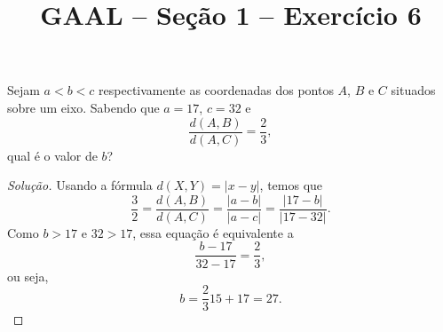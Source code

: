 \documentclass[a4paper,11pt]{article}
\title{GAAL -- Seção 1 -- Exercício 6}
\author{\empty}
\date{\empty}
\newcommand\onlyinsubfileone\maketitle
\begin{document}
\onlyinsubfileone

\begin{exercicio-gaal}[E6.S1]
  Sejam $a < b < c$ respectivamente as coordenadas dos pontos $A$, $B$ e $C$ situados sobre um eixo.
  Sabendo que $a = 17$, $c = 32$ e
  \[
    \frac{d(A,B)}{d(A,C)} = \frac{2}{3},
  \]
  qual é o valor de $b$?
\end{exercicio-gaal}

\begin{proof}[Solução]
  Usando a fórmula $d(X,Y) = |x-y|$, temos que
  \[
    \frac{3}{2} = \frac{d(A,B)}{d(A,C)} = \frac{|a-b|}{|a-c|} = \frac{|17-b|}{|17-32|}.
  \]
  Como $b > 17$ e $32 > 17$, essa equação é equivalente a
  \[
    \frac{b-17}{32-17} = \frac{2}{3},
  \]
  ou seja,
  \[
    b = \frac{2}{3} 15 + 17 = 27.
  \]
\end{proof}
\end{document}
